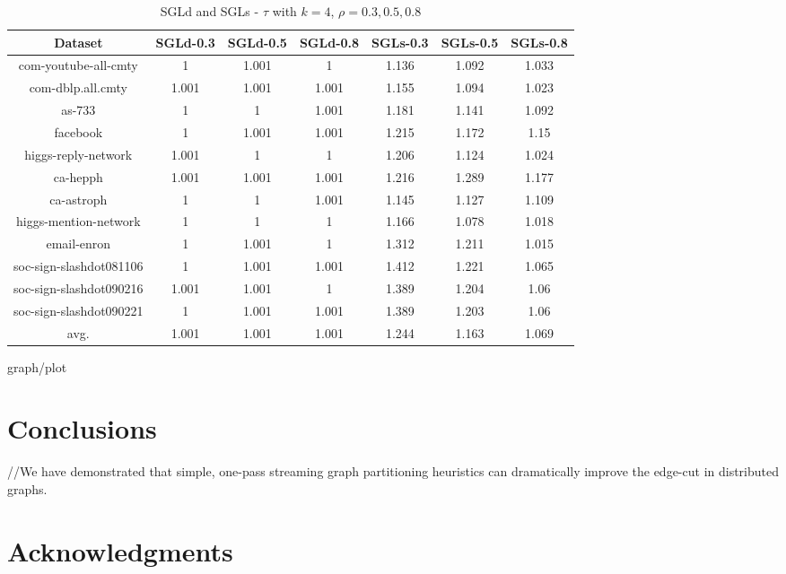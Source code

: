 \documentclass{sig-alternate-2013}
\begin{document}
\begin{table*}[!hpp]
\centering
\caption{SGLd and SGLs - $\tau$ with $k=4$, $\rho = 0.3, 0.5, 0.8$}
\begin{tabular}{ccccccc}
\hline
Dataset                     &SGLd-0.3       &SGLd-0.5       &SGLd-0.8       &SGLs-0.3       &SGLs-0.5       &SGLs-0.8\\
\hline
com-youtube-all-cmty        &1&1.001&1&1.136&1.092&1.033\\
com-dblp.all.cmty           &1.001&1.001&1.001&1.155&1.094&1.023\\
as-733                      &1&1&1.001&1.181&1.141&1.092\\
facebook                    &1&1.001&1.001&1.215&1.172&1.15\\
higgs-reply-network         &1.001&1&1&1.206&1.124&1.024\\
ca-hepph                    &1.001&1.001&1.001&1.216&1.289&1.177\\
ca-astroph                  &1&1&1.001&1.145&1.127&1.109\\
higgs-mention-network       &1&1&1&1.166&1.078&1.018\\
email-enron                 &1&1.001&1&1.312&1.211&1.015\\
soc-sign-slashdot081106     &1&1.001&1.001&1.412&1.221&1.065\\
soc-sign-slashdot090216     &1.001&1.001&1&1.389&1.204&1.06\\
soc-sign-slashdot090221     &1&1.001&1.001&1.389&1.203&1.06\\
\hline
avg.                        &1.001&1.001&1.001&1.244&1.163&1.069\\
\hline
\end{tabular}
\end{table*}

 {graph/plot}

\section{Conclusions}
//We have demonstrated that simple, one-pass streaming graph partitioning heuristics can dramatically improve the edge-cut in distributed graphs.
\section{Acknowledgments}




\balancecolumns
\end{document}
